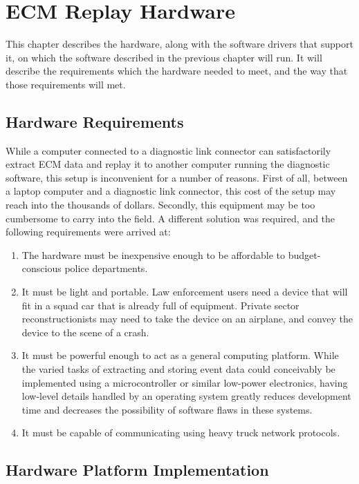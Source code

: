 \chapter{ECM Replay Hardware}

This chapter describes the hardware, along with the software drivers that support it, on which
the software described in the previous chapter will run. It will describe the requirements which
the hardware needed to meet, and the way that those requirements will met.


\section{Hardware Requirements}

While a computer connected to a diagnostic link connector can satisfactorily extract ECM data and replay
it to another computer running the diagnostic software, this setup is inconvenient for a number of reasons.
First of all, between a laptop computer and a diagnostic link connector, this cost of the setup
may reach into the thousands of dollars. Secondly, this equipment may be too cumbersome to carry into the field.
A different solution was required, and the following requirements were arrived at:

\begin{enumerate}
  \item The hardware must be inexpensive enough to be affordable to budget-conscious police departments.
  \item It must be light and portable. Law enforcement users need a device that will fit in a squad car that is already full of equipment.
        Private sector reconstructionists may need to take the device on an airplane, and convey the device to the scene of a crash.
  \item It must be powerful enough to act as a general computing platform. While the varied tasks of extracting and storing event data 
        could conceivably be implemented using a microcontroller or similar low-power electronics, having low-level details handled by
        an operating system greatly reduces development time and decreases the possibility of software flaws in these systems.
  \item It must be capable of communicating using heavy truck network protocols.
\end{enumerate}

\section{Hardware Platform Implementation}

